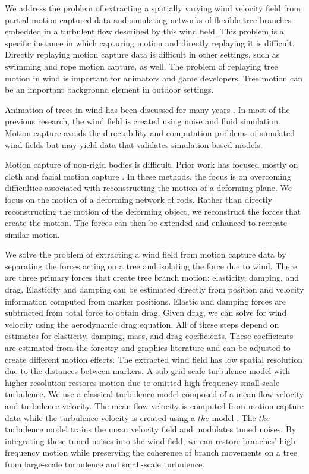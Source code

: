 We address the problem of extracting a spatially varying wind velocity field from partial motion captured data and simulating networks of flexible tree branches embedded in a turbulent flow described by this wind field. This problem is a specific instance in which capturing motion and directly replaying it is difficult.  Directly replaying motion capture data is difficult in other settings, such as swimming and rope motion capture, as well.  The problem of replaying tree motion in wind is important for animators and game developers. Tree motion can be an important background element in outdoor settings.  

Animation of trees in wind has been discussed for many years \cite{Akagi:cg06,stams:eu97,shinya:eu92}. In most of the previous research, the wind field is created using noise and fluid simulation. Motion capture avoids the directability and computation problems of simulated wind fields but may yield data that validates simulation-based models.

Motion capture of non-rigid bodies is difficult. Prior work has focused mostly on cloth and facial motion capture \cite{Kwatra:TVCG200966,Ma:FPS2008,SifakisEftychios2005,Lorenzo03}. In these methods, the focus is on overcoming difficulties associated with reconstructing the motion of a deforming plane. We focus on the motion of a deforming network of rods. Rather than directly reconstructing the motion of the deforming object, we reconstruct the forces that create the motion. The forces can then be extended and enhanced to recreate similar motion. 

We solve the problem of extracting a wind field from motion capture data by separating the forces acting on a tree and isolating the force due to wind. There are three primary forces that create tree branch motion: elasticity, damping, and drag. Elasticity and damping can be estimated directly from position and velocity information computed from marker positions. Elastic and damping forces are subtracted from total force to obtain drag. Given drag, we can solve for wind velocity using the aerodynamic drag equation. All of these steps depend on estimates for elasticity, damping, mass, and drag coefficients. These coefficients are estimated from the forestry and graphics literature and can be adjusted to create different motion effects. The extracted wind field has low spatial resolution due to the distances between markers. A sub-grid scale turbulence model with higher resolution restores motion due to omitted high-frequency small-scale turbulence. We use a classical turbulence model composed of a mean flow velocity and turbulence velocity. The mean flow velocity is computed from motion capture data while the turbulence velocity is created using a $tke$ model \cite{Selino:2012,pfa10,pope2000}. The $tke$ turbulence model trains the mean velocity field and modulates tuned noises. By integrating these tuned noises into the wind field, we can restore branches' high-frequency motion while preserving the coherence of branch movements on a tree from large-scale turbulence and small-scale turbulence. 

